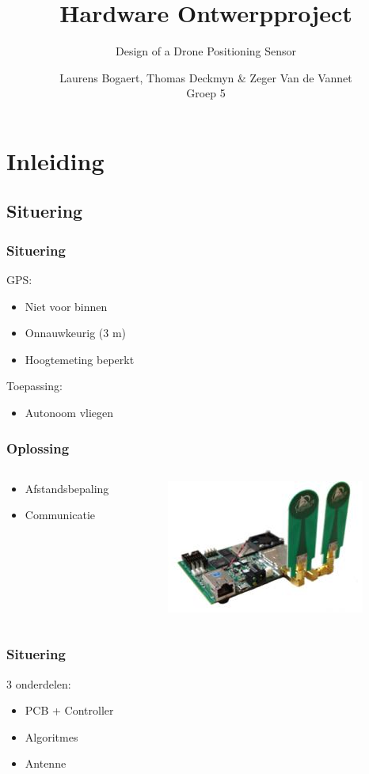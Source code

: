 \documentclass{beamer}
\title{\textbf{Hardware Ontwerpproject}}
\subtitle{Design of a Drone Positioning Sensor}
\author{Laurens Bogaert, Thomas Deckmyn \& Zeger Van de Vannet\\Groep 5}
\begin{document}
\begin{frame}
  \titlepage
\end{frame}

\section{Inleiding}
\subsection{Situering}
  \begin{frame}
    \frametitle{Situering}
    GPS:
    \begin{itemize}
        \item Niet voor binnen
        \item Onnauwkeurig (3 m)
        \item Hoogtemeting beperkt
    \end{itemize}
    Toepassing:
     \begin{itemize}
        \item Autonoom vliegen
    \end{itemize}   
  \end{frame}
  \begin{frame}
  \frametitle{Oplossing}
   \begin{columns}
    \begin{column}{0.5\textwidth}
  	\begin{itemize}
  		\item Afstandsbepaling
  		\item Communicatie
  	\end{itemize} 
    \end{column}
    \begin{column}{0.5\textwidth}
  	\includegraphics[width=\textwidth]{images/Pulson400UWB.jpg}
    \end{column}
    \end{columns}
  \end{frame} 
  \begin{frame}
    \frametitle{Situering}
    3 onderdelen:
    \begin{itemize}
      \item PCB + Controller
      \item Algoritmes
      \item Antenne
    \end{itemize}
  \end{frame}
\end{document}
